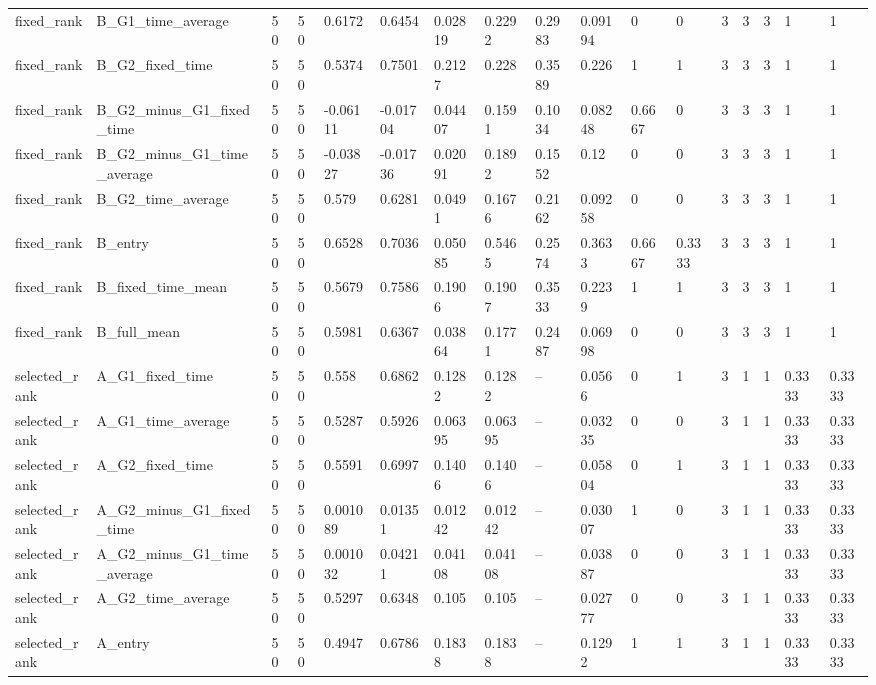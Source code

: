 \begin{longtable}{lllllllllllllllll}
fixed\_rank & B\_G1\_time\_average & 50 & 50 & 0.6172 & 0.6454 & 0.02819 & 0.2292 & 0.2983 & 0.09194 & 0 & 0 & 3 & 3 & 3 & 1 & 1 \\
fixed\_rank & B\_G2\_fixed\_time & 50 & 50 & 0.5374 & 0.7501 & 0.2127 & 0.228 & 0.3589 & 0.226 & 1 & 1 & 3 & 3 & 3 & 1 & 1 \\
fixed\_rank & B\_G2\_minus\_G1\_fixed\_time & 50 & 50 & -0.06111 & -0.01704 & 0.04407 & 0.1591 & 0.1034 & 0.08248 & 0.6667 & 0 & 3 & 3 & 3 & 1 & 1 \\
fixed\_rank & B\_G2\_minus\_G1\_time\_average & 50 & 50 & -0.03827 & -0.01736 & 0.02091 & 0.1892 & 0.1552 & 0.12 & 0 & 0 & 3 & 3 & 3 & 1 & 1 \\
fixed\_rank & B\_G2\_time\_average & 50 & 50 & 0.579 & 0.6281 & 0.0491 & 0.1676 & 0.2162 & 0.09258 & 0 & 0 & 3 & 3 & 3 & 1 & 1 \\
fixed\_rank & B\_entry & 50 & 50 & 0.6528 & 0.7036 & 0.05085 & 0.5465 & 0.2574 & 0.3633 & 0.6667 & 0.3333 & 3 & 3 & 3 & 1 & 1 \\
fixed\_rank & B\_fixed\_time\_mean & 50 & 50 & 0.5679 & 0.7586 & 0.1906 & 0.1907 & 0.3533 & 0.2239 & 1 & 1 & 3 & 3 & 3 & 1 & 1 \\
fixed\_rank & B\_full\_mean & 50 & 50 & 0.5981 & 0.6367 & 0.03864 & 0.1771 & 0.2487 & 0.06998 & 0 & 0 & 3 & 3 & 3 & 1 & 1 \\
selected\_rank & A\_G1\_fixed\_time & 50 & 50 & 0.558 & 0.6862 & 0.1282 & 0.1282 & -- & 0.0566 & 0 & 1 & 3 & 1 & 1 & 0.3333 & 0.3333 \\
selected\_rank & A\_G1\_time\_average & 50 & 50 & 0.5287 & 0.5926 & 0.06395 & 0.06395 & -- & 0.03235 & 0 & 0 & 3 & 1 & 1 & 0.3333 & 0.3333 \\
selected\_rank & A\_G2\_fixed\_time & 50 & 50 & 0.5591 & 0.6997 & 0.1406 & 0.1406 & -- & 0.05804 & 0 & 1 & 3 & 1 & 1 & 0.3333 & 0.3333 \\
selected\_rank & A\_G2\_minus\_G1\_fixed\_time & 50 & 50 & 0.001089 & 0.01351 & 0.01242 & 0.01242 & -- & 0.03007 & 1 & 0 & 3 & 1 & 1 & 0.3333 & 0.3333 \\
selected\_rank & A\_G2\_minus\_G1\_time\_average & 50 & 50 & 0.001032 & 0.04211 & 0.04108 & 0.04108 & -- & 0.03887 & 0 & 0 & 3 & 1 & 1 & 0.3333 & 0.3333 \\
selected\_rank & A\_G2\_time\_average & 50 & 50 & 0.5297 & 0.6348 & 0.105 & 0.105 & -- & 0.02777 & 0 & 0 & 3 & 1 & 1 & 0.3333 & 0.3333 \\
selected\_rank & A\_entry & 50 & 50 & 0.4947 & 0.6786 & 0.1838 & 0.1838 & -- & 0.1292 & 1 & 1 & 3 & 1 & 1 & 0.3333 & 0.3333 \\

\end{longtable}
